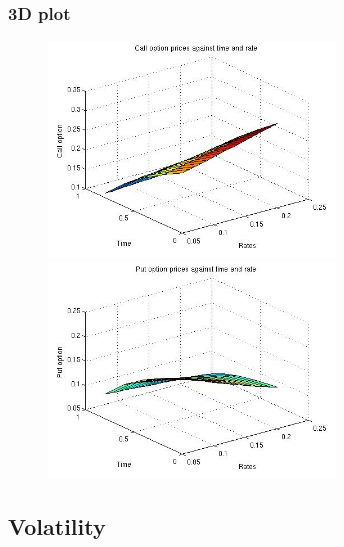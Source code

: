 \documentclass[12pt]{article}
\begin{document}
    \subsubsection*{3D plot}
    \begin{figure}[ht]
    \centering
      \begin{minipage}{.45\textwidth}
        \centering
        \includegraphics[width=3in]{call-time-rate.jpg}
      \end{minipage}
      \begin{minipage}{.45\textwidth}
        \centering
        \includegraphics[width=3in]{put-time-rate.jpg}
      \end{minipage}
    \end{figure}

  \newpage
  \subsection*{Volatility}
\end{document}
